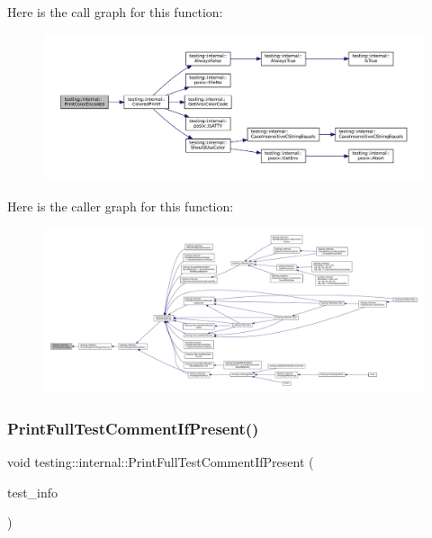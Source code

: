 Here is the call graph for this function\+:
\nopagebreak
\begin{figure}[H]
\begin{center}
\leavevmode
\includegraphics[width=350pt]{namespacetesting_1_1internal_a7d8c446a29c7e22d7d4dde8f530bb57e_cgraph}
\end{center}
\end{figure}
Here is the caller graph for this function\+:
\nopagebreak
\begin{figure}[H]
\begin{center}
\leavevmode
\includegraphics[width=350pt]{namespacetesting_1_1internal_a7d8c446a29c7e22d7d4dde8f530bb57e_icgraph}
\end{center}
\end{figure}
\mbox{\label{namespacetesting_1_1internal_a7a85ebe3b4de93a1edb091f92f1fb393}} 
\subsubsection{\texorpdfstring{Print\+Full\+Test\+Comment\+If\+Present()}{PrintFullTestCommentIfPresent()}}
{\footnotesize\ttfamily void testing\+::internal\+::\+Print\+Full\+Test\+Comment\+If\+Present (\begin{DoxyParamCaption}\item[{const \hyperlink{classtesting_1_1TestInfo}{Test\+Info} \&}]{test\+\_\+info }\end{DoxyParamCaption})}



